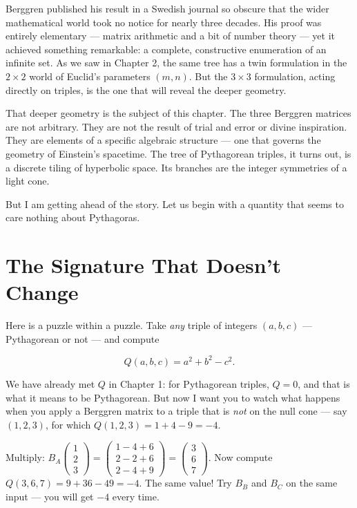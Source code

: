 Berggren published his result in a Swedish journal so obscure that the wider mathematical world took no notice for nearly three decades. His proof was entirely elementary --- matrix arithmetic and a bit of number theory --- yet it achieved something remarkable: a complete, constructive enumeration of an infinite set. As we saw in Chapter 2, the same tree has a twin formulation in the $2 \times 2$ world of Euclid's parameters $(m, n)$. But the $3 \times 3$ formulation, acting directly on triples, is the one that will reveal the deeper geometry.

That deeper geometry is the subject of this chapter. The three Berggren matrices are not arbitrary. They are not the result of trial and error or divine inspiration. They are elements of a specific algebraic structure --- one that governs the geometry of Einstein's spacetime. The tree of Pythagorean triples, it turns out, is a discrete tiling of hyperbolic space. Its branches are the integer symmetries of a light cone.

But I am getting ahead of the story. Let us begin with a quantity that seems to care nothing about Pythagoras.

\bigskip

\section*{The Signature That Doesn't Change}

Here is a puzzle within a puzzle. Take \textit{any} triple of integers $(a, b, c)$ --- Pythagorean or not --- and compute

\[
Q(a, b, c) = a^2 + b^2 - c^2.
\]

We have already met $Q$ in Chapter 1: for Pythagorean triples, $Q = 0$, and that is what it means to be Pythagorean. But now I want you to watch what happens when you apply a Berggren matrix to a triple that is \textit{not} on the null cone --- say $(1, 2, 3)$, for which $Q(1, 2, 3) = 1 + 4 - 9 = -4$.

Multiply: $B_A \begin{pmatrix} 1 \\ 2 \\ 3 \end{pmatrix} = \begin{pmatrix} 1 - 4 + 6 \\ 2 - 2 + 6 \\ 2 - 4 + 9 \end{pmatrix} = \begin{pmatrix} 3 \\ 6 \\ 7 \end{pmatrix}.$ Now compute $Q(3, 6, 7) = 9 + 36 - 49 = -4.$ The same value! Try $B_B$ and $B_C$ on the same input --- you will get $-4$ every time.


